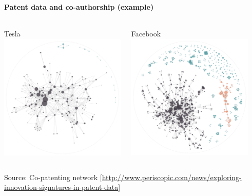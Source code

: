 \documentclass[8pt]{beamer}
\begin{document}

\begin{frame}
\frametitle{\insertsection}
\framesubtitle{Patent data and co-authorship (example)}

\begin{columns}[c]

\centering
Tesla\\
\includegraphics[width=6cm]{tesla_patents}

\centering
Facebook\\
\includegraphics[width=6cm]{facebook_patents}

\end{columns}

\medskip

\centering 
\tiny{Source: Co-patenting network [\url{http://www.periscopic.com/news/exploring-innovation-signatures-in-patent-data}]}

\end{frame}

\end{document}
